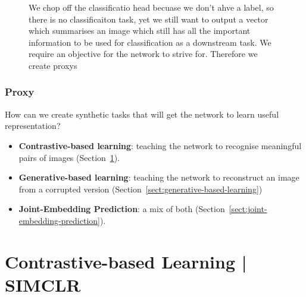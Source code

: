 \documentclass[11pt]{article}
\begin{document}
\begin{figure}[H]
    \centering
    \caption*{We chop off the classificatio head becuase we don't ahve a label, so there is no classificaiton task, yet we still want to output a vector which summarises an image which still has all the important information to be used for classification as a downstream task. We require an objective for the network to strive for. Therefore we create proxys}
\end{figure}

\subsubsection{Proxy}

How can we create synthetic tasks that will get the network to learn useful representation?

\begin{itemize}
    \item \textbf{Contrastive-based learning}: teaching the network to recognise meaningful pairs of images (Section~\ref{sect:contrastive-based-learning}).
    \item \textbf{Generative-based learning}: teaching the network to reconstruct an image from a corrupted version (Section~\ref{sect:generative-based-learning})
    \item \textbf{Joint-Embedding Prediction}: a mix of both (Section~\ref{sect:joint-embedding-prediction}).
\end{itemize}

\section{Contrastive-based Learning | SIMCLR}\label{sect:contrastive-based-learning}
\end{document}
